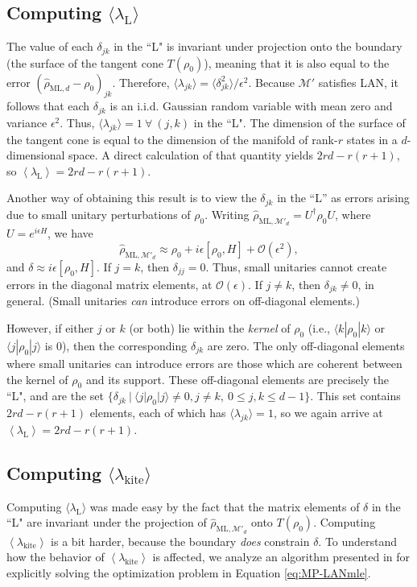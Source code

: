 \documentclass[aps,pra, twocolumn]{revtex4-1}
\newcommand{\M}{\mathcal{M}}
\newcommand{\expect}[1]{\ensuremath{\left\langle#1\right\rangle}}
\newcommand{\rhohat}{\hat{\rho}}
\newcommand{\rhoML}[1]{\rhohat_{\scriptscriptstyle{\mathrm{ML},#1}}}
\begin{document}
\subsection{Computing $\langle \lambda_\mathrm{L}\rangle$}
\label{subsec:L}
The value of each $\delta_{jk}$ in the ``L" is invariant under projection onto the boundary (the surface of the tangent cone $T(\rho_{0})$), meaning that it is also equal to the error $(\rhoML{d} - \rho_{0})_{jk}$. Therefore,  $\langle \lambda_{jk} \rangle = \langle \delta_{jk}^{2}\rangle /\epsilon^{2}$. Because $\M'$ satisfies LAN, it follows that each $\delta_{jk}$ is an i.i.d. Gaussian random variable with mean zero and variance $\epsilon^{2}$. Thus, $\langle \lambda_{jk}\rangle = 1~\forall~(j,k)$ in the ``L". The dimension of the surface of the tangent cone is equal to the dimension of the manifold of rank-$r$ states in a $d$-dimensional space. A direct calculation of that quantity yields $2rd - r(r+1)$, so $\expect{\lambda_{\mathrm{L}}} = 2rd - r(r+1)$.

Another way of obtaining this result is to view the $\delta_{jk}$ in the ``L'' as errors arising due to small unitary perturbations of $\rho_{0}$. Writing $\rhoML{\M'_{d}} = U^{\dagger}\rho_{0}U$, where $U=e^{i\epsilon H}$, we have
\[\rhoML{\M'_{d}} \approx \rho_{0} + i\epsilon [\rho_{0},H]+\mathcal{O}(\epsilon^{2}),\]
and $\delta \approx i\epsilon [\rho_{0},H]$.
If $j = k$, then $\delta_{jj} = 0$. Thus, small unitaries cannot create errors in the diagonal matrix elements, at $\mathcal{O}(\epsilon)$. If $j \neq k$, then $\delta_{jk} \neq 0$, in general. (Small unitaries \emph{can} introduce errors on off-diagonal elements.)

However, if either $j$ or $k$ (or both) lie within the \emph{kernel} of $\rho_{0}$ (i.e., $\langle k | \rho_{0}| k \rangle$ or $\langle j|\rho_{0}|j\rangle$ is 0), then the corresponding $\delta_{jk}$ are zero. The only off-diagonal elements where small unitaries can introduce errors are those which are coherent between the kernel of $\rho_{0}$ and its support. These off-diagonal elements are precisely the ``L", and are  the set $\{\delta_{jk}~|~\langle j | \rho_{0}|j\rangle \neq 0, j\neq k, ~ 0 \leq j,k \leq d - 1\}$. This set contains $2rd - r(r+1)$ elements, each of which has $\langle \lambda_{jk}\rangle = 1$, so we again arrive at $\expect{\lambda_{\mathrm{L}}} = 2rd - r(r+1)$.

\subsection{Computing $\langle \lambda_\mathrm{kite}\rangle$}
\label{subsec:kite}
Computing $\langle \lambda_{\mathrm{L}}\rangle$ was made easy by the fact that the matrix elements of $\delta$ in the ``L" are invariant under the projection of $\rhoML{\M'_{d}}$ onto $T(\rho_{0})$. Computing $\expect{\lambda_{\mathrm{kite}}}$ is a bit harder, because the boundary \emph{does} constrain $\delta$. To understand how the behavior of $\expect{\lambda_{\mathrm{kite}}}$ is affected, we analyze an algorithm presented in \cite{Smolin2012} for explicitly solving the optimization problem in Equation \eqref{eq:MP-LANmle}.
\end{document}
